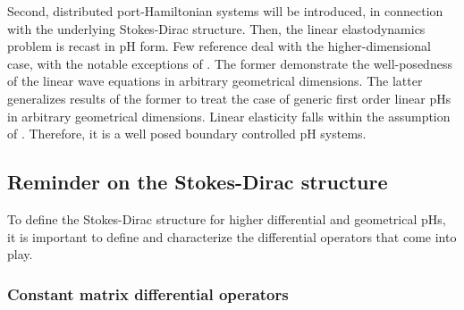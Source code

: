 Second, distributed port-Hamiltonian systems will be introduced, in connection with the underlying Stokes-Dirac structure. Then, the linear elastodynamics problem is recast in pH form.  Few reference deal with the higher-dimensional case, with the notable exceptions of \cite{zwart2015wave,skrepek2019wellposedness}. The former demonstrate the well-posedness of the linear wave equations in arbitrary geometrical dimensions. The latter generalizes results of the former to treat the case of generic first order linear pHs in arbitrary geometrical dimensions. Linear elasticity falls within the assumption of \cite{skrepek2019wellposedness}. Therefore, it is a well posed boundary controlled pH systems. 

 
\subsection{Reminder on the Stokes-Dirac structure}

To define the Stokes-Dirac structure for higher differential and geometrical pHs, it is important to define and characterize the differential operators that come into play. 

\subsubsection{Constant matrix differential operators}

